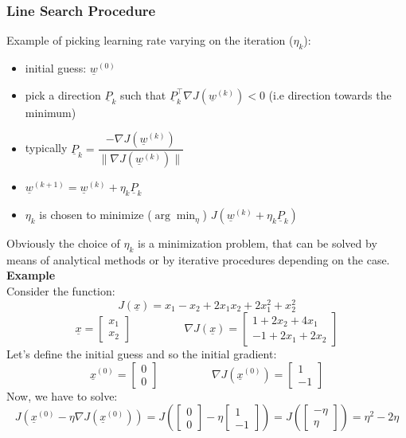 \subsubsection{Line Search Procedure}
Example of picking learning rate varying on the iteration ($\eta_k$):
\begin{itemize}
    \item initial guess: $\underline{w}^{(0)}$
    \item pick a direction $\underline{P}_k$ such that $\underline{P}_k^\intercal \nabla J(\underline{w}^{(k)}) < 0$ (i.e direction towards the minimum)
    \item typically $\underline{P}_k = \dfrac{-\nabla J(\underline{w}^{(k)})}{\|\nabla J(\underline{w}^{(k)})\|}$
    \item $\underline{w}^{(k+1)} = \underline{w}^{(k)} + \eta_k\underline{P}_k$
    \item $\eta_k$ is chosen to minimize ($\arg\min_{\eta}$) $J(\underline{w}^{(k)} + \eta_k\underline{P}_k)$
\end{itemize}
Obviously the choice of $\eta_k$ is a minimization problem, that can be solved by means of analytical methods or by iterative procedures depending on the case. \\
\textbf{Example}\\
Consider the function:
\[J(\underline{x}) = x_1 - x_2 + 2x_1x_2 + 2x_1^2 + x_2^2\]
\[
    \underline{x} = \begin{bmatrix}
        x_1\\x_2
    \end{bmatrix} \hspace{2cm}
    \nabla J(\underline{x}) = \begin{bmatrix}
        1 + 2x_2 + 4x_1\\-1 + 2x_1 + 2x_2
    \end{bmatrix}    
\]
Let's define the initial guess and so the initial gradient:
\[
    \underline{x}^{(0)} = 
    \begin{bmatrix}
        0\\0
    \end{bmatrix} \hspace{2cm}
    \nabla J(\underline{x}^{(0)}) =
    \begin{bmatrix}
        1\\-1
    \end{bmatrix}    
\]
Now, we have to solve:
\[
    J(\underline{x}^{(0)} - \eta \nabla J(\underline{x}^{(0)})) = J\left(  
        \begin{bmatrix}
            0\\0
        \end{bmatrix}-
        \eta 
        \begin{bmatrix}
            1\\-1
        \end{bmatrix}
    \right) = J\left(  
        \begin{bmatrix}
            -\eta\\
            \eta
        \end{bmatrix}
        \right) = \eta^2 - 2\eta
\]
